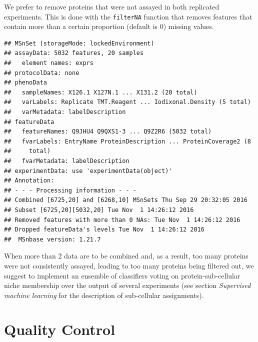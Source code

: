 We prefer to remove proteins that were not assayed in both replicated
experiments. This is done with the \texttt{filterNA} function that
removes features that contain more than a certain proportion (default
is 0) missing values.

\begin{knitrout}
\color{fgcolor}\begin{kframe}
\begin{alltt}
 \hlkwb{<-} 
\end{alltt}
\begin{verbatim}
## MSnSet (storageMode: lockedEnvironment)
## assayData: 5032 features, 20 samples 
##   element names: exprs 
## protocolData: none
## phenoData
##   sampleNames: X126.1 X127N.1 ... X131.2 (20 total)
##   varLabels: Replicate TMT.Reagent ... Iodixonal.Density (5 total)
##   varMetadata: labelDescription
## featureData
##   featureNames: Q9JHU4 Q9QXS1-3 ... Q9Z2R6 (5032 total)
##   fvarLabels: EntryName ProteinDescription ... ProteinCoverage2 (8
##     total)
##   fvarMetadata: labelDescription
## experimentData: use 'experimentData(object)'
## Annotation:  
## - - - Processing information - - -
## Combined [6725,20] and [6268,10] MSnSets Thu Sep 29 20:32:05 2016 
## Subset [6725,20][5032,20] Tue Nov  1 14:26:12 2016 
## Removed features with more than 0 NAs: Tue Nov  1 14:26:12 2016 
## Dropped featureData's levels Tue Nov  1 14:26:12 2016 
##  MSnbase version: 1.21.7
\end{verbatim}
\end{kframe}
\end{knitrout}

When more than 2 data are to be combined and, as a result, too many
proteins were not consistently assayed, leading to too many proteins
being filtered out, we suggest to implement an ensemble of classifiers
voting on protein-sub-cellular niche membership over the output of
several experiments (see section \textit{Supervised machine learning}
for the description of sub-cellular assignments).

\section*{Quality Control}

